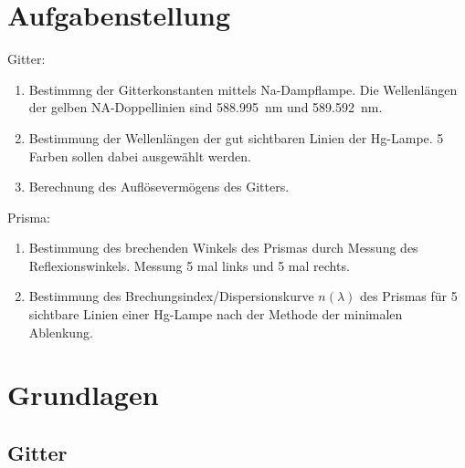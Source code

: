 \documentclass{article}
\begin{document}
\parindent0cm




\pagestyle{fancy}

\section{Aufgabenstellung}

Gitter:
\begin{enumerate}
\item Bestimmng der Gitterkonstanten mittels Na-Dampflampe. Die Wellenlängen der gelben NA-Doppellinien sind 588.995~nm und 589.592~nm.

\item Bestimmung der Wellenlängen der gut sichtbaren Linien der Hg-Lampe. 5 Farben sollen dabei ausgewählt werden. 

\item Berechnung des Auflösevermögens des Gitters.%
\end{enumerate}


Prisma: 
\begin{enumerate}
\item Bestimmung des brechenden Winkels des Prismas durch Messung des Reflexionswinkels. Messung 5 mal links und 5 mal rechts. %
\item Bestimmung des Brechungsindex/Dispersionskurve $n(\lambda)$ des Prismas für 5 sichtbare Linien einer Hg-Lampe nach der Methode der minimalen Ablenkung. %
\end{enumerate}


\section{Grundlagen}

\subsection{Gitter}
\end{document}

